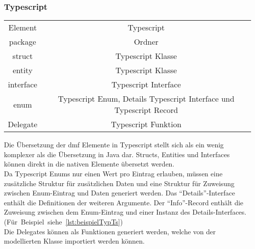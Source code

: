 \documentclass[./einleitung.tex]{subfiles}
\begin{document}
    \subsubsection{Typescript}
    \begin{center}
        \begin{tabular}{| c || c |}
            \hline
            Element   & Typescript           \\
            \hhline{|=||=|}
            package   & Ordner               \\
            \hline
            struct    & Typescript Klasse    \\
            \hline
            entity    & Typescript Klasse    \\
            \hline
            interface & Typescript Interface \\
            \hline
            enum      & Typescript Enum, Details Typescript Interface und Typescript Record   \\
            \hline
            Delegate  & Typescript Funktion    \\
            \hline
        \end{tabular}
    \end{center}
    Die Übersetzung der \acrshort{dmf} Elemente in Typescript stellt sich als ein wenig komplexer als die Übersetzung in Java dar.
    Structs, Entities und Interfaces können direkt in die nativen Elemente übersetzt werden.\\
    Da Typescript Enums nur einen Wert pro Eintrag erlauben, müssen eine zusätzliche Struktur für zusätzlichen Daten und eine Struktur für Zuweisung zwischen Enum-Eintrag und Daten generiert werden.
    Das ``Details''-Interface enthält die Definitionen der weiteren Argumente.
    Der ``Info''-Record enthält die Zuweisung zwischen dem Enum-Eintrag und einer Instanz des Details-Interfaces. (Für~Beispiel~siehe~\ref{lst:beispielTypTs})\\
    Die Delegates können als Funktionen generiert werden, welche von der modellierten Klasse importiert werden können.
\end{document}

